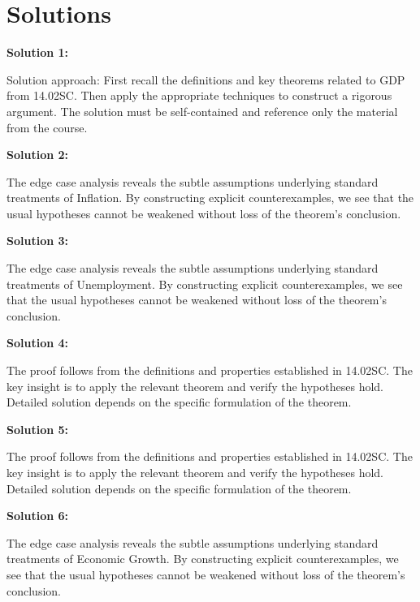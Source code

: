 \documentclass[12pt,a4paper]{exam}
\begin{document}
\newpage
\section*{Solutions}

\textbf{Solution 1:}

Solution approach: First recall the definitions and key theorems related to GDP from 14.02SC. Then apply the appropriate techniques to construct a rigorous argument. The solution must be self-contained and reference only the material from the course.

\vspace{0.5cm}

\textbf{Solution 2:}

The edge case analysis reveals the subtle assumptions underlying standard treatments of Inflation. By constructing explicit counterexamples, we see that the usual hypotheses cannot be weakened without loss of the theorem's conclusion.

\vspace{0.5cm}

\textbf{Solution 3:}

The edge case analysis reveals the subtle assumptions underlying standard treatments of Unemployment. By constructing explicit counterexamples, we see that the usual hypotheses cannot be weakened without loss of the theorem's conclusion.

\vspace{0.5cm}

\textbf{Solution 4:}

The proof follows from the definitions and properties established in 14.02SC. The key insight is to apply the relevant theorem and verify the hypotheses hold. Detailed solution depends on the specific formulation of the theorem.

\vspace{0.5cm}

\textbf{Solution 5:}

The proof follows from the definitions and properties established in 14.02SC. The key insight is to apply the relevant theorem and verify the hypotheses hold. Detailed solution depends on the specific formulation of the theorem.

\vspace{0.5cm}

\textbf{Solution 6:}

The edge case analysis reveals the subtle assumptions underlying standard treatments of Economic Growth. By constructing explicit counterexamples, we see that the usual hypotheses cannot be weakened without loss of the theorem's conclusion.
\end{document}
